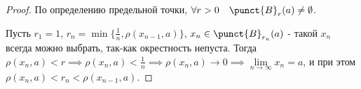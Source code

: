 \begin{properties}
\begin{enumerate}
\begin{proof}
                По определению предельной точки, $\forall{r > 0}\quad \punct{B}_{r}(a) \neq \emptyset$.

                Пусть $r_1 = 1$, $r_{n} = \min \{\frac{1}{n}, \rho(x_{n-1}, a)\}$, $x_{n}\in \punct{B}_{r_{n}}(a)$ - такой $x_{n}$ всегда можно выбрать, так-как окрестность непуста. Тогда $\rho(x_{n}, a) < r \implies \rho(x_{n}, a) < \frac{1}{n} \implies \rho(x_{n}, a) \to 0 \implies \lim\limits_{n \to \infty} x_{n} = a$, и при этом $\rho(x_{n}, a) < r_{n} < \rho(x_{n-1}, a)$.
            \end{proof}
    \end{enumerate}
\end{properties}
